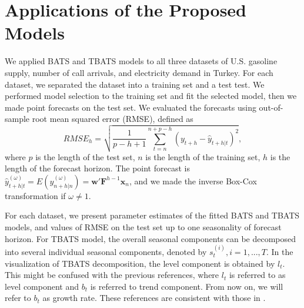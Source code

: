 \documentclass{uwstat572}
\begin{document}
\section{Applications of the Proposed Models}
\hspace{4ex}We applied BATS and TBATS models to all three datasets of U.S. gasoline supply, number of call arrivals, and electricity demand in Turkey. For each dataset, we separated the dataset into a training set and a test test. We performed model selection to the training set and fit the selected model, then we made point forecasts on the test set. We evaluated the forecasts using out-of-sample root mean squared error (RMSE), defined as
\begin{equation}
RMSE_h=\sqrt{\frac{1}{p-h+1} \sum\limits_{t=n}^{n+p-h} (y_{t+h}-\hat{y}_{t+h|t})^2},
\end{equation} 
\noindent where $p$ is the length of the test set, $n$ is the length of the training set, $h$ is the length of the forecast horizon. The point forecast is $\hat{y}_{t+h|t}^{(\omega)}=E(y_{n+h|n}^{(\omega)})= \textbf{w}'\textbf{F}^{h-1} \textbf{x}_n$, and we made the inverse Box-Cox transformation if $\omega \neq1$. 

For each dataset, we present parameter estimates of the fitted BATS and TBATS models, and values of RMSE on the test set up to one seasonality of forecast horizon. For TBATS model, the overall seasonal components can be decomposed into several individual seasonal components, denoted by $s_t^{(i)}, i=1,...,T$. In the visualization of TBATS decomposition, the level component is obtained by $l_t$. This might be confused with the previous references, where $l_t$ is referred to as level component and $b_t$ is referred to trend component. From now on, we will refer to $b_t$ as growth rate. These references are consistent with those in \citet{de2011forecasting}.
\end{document}
